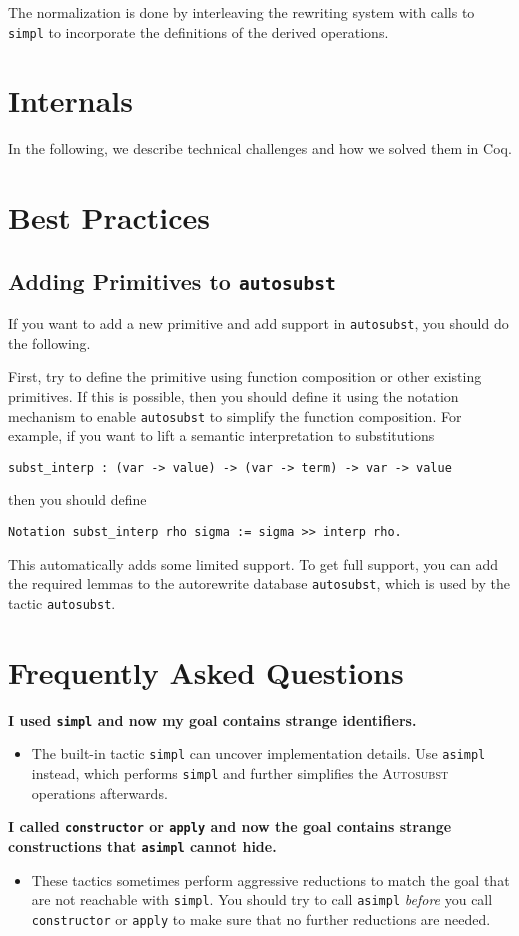 \documentclass{scrartcl}
\newcommand{\faq}[2]{\vspace{\topsep}\noindent\textbf{#1}\\\vspace{-\topsep}\begin{itemize}[nolistsep]\item[]{#2}\end{itemize}}
\newcommand{\Autosubst}{\textsc{Autosubst}\xspace}
\newcommand{\lst}{\lstinline}
\begin{document}
The normalization is done by interleaving the rewriting system with calls to \lst$simpl$ to incorporate the definitions of the derived operations. 


\section{Internals}
\label{sec:internals}

In the following, we describe technical challenges and how we solved them in Coq.

\section{Best Practices}
\label{sec:best-practices}



\subsection{Adding Primitives to \lst$autosubst$}
\label{sec:adding-prim}

If you want to add a new primitive and add support in \lst$autosubst$, you should do the following.

First, try to define the primitive using function composition or other existing primitives.
If this is possible, then you should define it using the notation mechanism to enable \lst$autosubst$ to simplify the function composition.
For example, if you want to lift a semantic interpretation to substitutions 
\begin{lstlisting}
subst_interp : (var -> value) -> (var -> term) -> var -> value  
\end{lstlisting}
then you should define
\begin{lstlisting}
Notation subst_interp rho sigma := sigma >> interp rho.
\end{lstlisting}
This automatically adds some limited support. To get full support, you can add the required lemmas to the autorewrite database \lst$autosubst$, which is used by the tactic \lst$autosubst$.


\section{Frequently Asked Questions}
\label{sec:faq}

\faq{I used \lst$simpl$ and now my goal contains strange identifiers.}
{The built-in tactic \lst$simpl$ can uncover implementation details. Use \lst$asimpl$ instead, which performs \lst$simpl$ and further simplifies the \Autosubst operations afterwards.}

\faq{I called \lst$constructor$ or \lst$apply$ and now the goal contains strange constructions that \lst$asimpl$ cannot hide.}
{These tactics sometimes perform aggressive reductions to match the goal that are not reachable with \lst$simpl$. You should try to call \lst$asimpl$ \emph{before} you call \lst$constructor$ or \lst$apply$ to make sure that no further reductions are needed.
}



\end{document}
